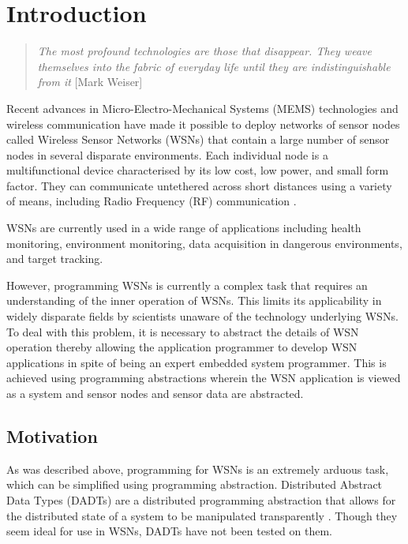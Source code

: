 \chapter{Introduction} \label{chap:Intro}

\begin{quote}
\emph{The most profound technologies are those that disappear. They weave
themselves into the fabric of everyday life until they are indistinguishable
from it} [Mark Weiser]
\end{quote}

Recent advances in Micro-Electro-Mechanical Systems (MEMS)
technologies and wireless communication have made it possible to deploy networks
of sensor nodes called Wireless Sensor Networks (WSNs) that contain a large
number of sensor nodes in several disparate environments. Each individual node is
a multifunctional device characterised by its low cost, low power, and small form
factor. They can communicate untethered across short distances using a variety of
means, including Radio Frequency (RF) communication
\cite{SensorSurveyAkyildiz:2002}.

WSNs are currently used in a wide range of applications including health
monitoring, environment monitoring, data acquisition in dangerous environments,
and target tracking.

However, programming WSNs is currently a complex task that requires an
understanding of the inner operation of WSNs. This limits its applicability in
widely disparate fields by scientists unaware of the technology underlying WSNs.
To deal with this problem, it is necessary to abstract the details of WSN operation
thereby allowing the application programmer to develop WSN applications in spite
of being an expert embedded system programmer. This is
achieved using programming abstractions wherein the WSN application is viewed as a system
and sensor nodes and sensor data are abstracted.

\section{Motivation}

As was described above, programming for WSNs is an extremely arduous task, which
can be simplified using programming abstraction. Distributed Abstract Data Types
(DADTs) are a distributed programming abstraction that allows for the
distributed state of a system to be manipulated transparently
\cite{migliavacca_DADT:2006}. Though they seem ideal for use in WSNs, DADTs have
not been tested on them.

